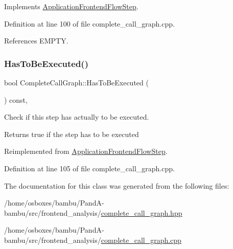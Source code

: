 Implements \hyperlink{classApplicationFrontendFlowStep_a2bf060a5ebc1735635dc5c7773387a25}{Application\+Frontend\+Flow\+Step}.



Definition at line 100 of file complete\+\_\+call\+\_\+graph.\+cpp.



References E\+M\+P\+TY.

\mbox{\label{classCompleteCallGraph_a8380495bcddb634f538066b11d927d70}} 
\subsubsection{\texorpdfstring{Has\+To\+Be\+Executed()}{HasToBeExecuted()}}
{\footnotesize\ttfamily bool Complete\+Call\+Graph\+::\+Has\+To\+Be\+Executed (\begin{DoxyParamCaption}{ }\end{DoxyParamCaption}) const\hspace{0.3cm}{\ttfamily [override]}, {\ttfamily [virtual]}}



Check if this step has actually to be executed. 

\begin{DoxyReturn}{Returns}
true if the step has to be executed 
\end{DoxyReturn}


Reimplemented from \hyperlink{classApplicationFrontendFlowStep_ad99f4dcbab470c65eea79ae0291a4bd5}{Application\+Frontend\+Flow\+Step}.



Definition at line 105 of file complete\+\_\+call\+\_\+graph.\+cpp.



The documentation for this class was generated from the following files\+:\begin{DoxyCompactItemize}
\item 
/home/osboxes/bambu/\+Pand\+A-\/bambu/src/frontend\+\_\+analysis/\hyperlink{complete__call__graph_8hpp}{complete\+\_\+call\+\_\+graph.\+hpp}\item 
/home/osboxes/bambu/\+Pand\+A-\/bambu/src/frontend\+\_\+analysis/\hyperlink{complete__call__graph_8cpp}{complete\+\_\+call\+\_\+graph.\+cpp}\end{DoxyCompactItemize}
